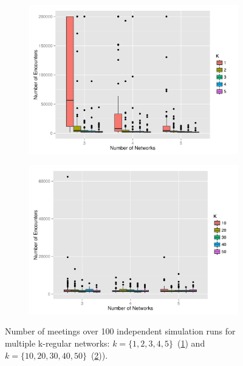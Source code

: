 \documentclass[preprint,number]{elsarticle}
\begin{document}
      \begin{figure}[H]
        \centering
	\begin{subfigure}{.49\linewidth}
		\centering
		\includegraphics[width=1\linewidth]{"../analysis/pdf/context_permeability_encounters_kregular_12345"}
		\caption{}
		\label{fig:ctx_perm_kreg_12345}
              \end{subfigure}%
              \begin{subfigure}{.49\linewidth}
		\centering
		\includegraphics[width=1\linewidth]{"../analysis/pdf/context_permeability_encounters_kregular_1020304050"}
		\caption{}
		\label{fig:ctx_perm_kreg_1020304050}
              \end{subfigure}
              \begin{minipage}{0.9\linewidth}
		\vspace{0.2cm}
		\caption{Number of meetings over 100 independent simulation runs for multiple
                  k-regular networks: $k=\{1,2,3,4,5\}$~(\ref{fig:ctx_perm_kreg_12345}) and
                  $k=\{10,20,30,40,50\}$~(\ref{fig:ctx_perm_kreg_1020304050})).}
		\label{fig:ctx_perm_kreg}
              \end{minipage}
      \end{figure}
\end{document}

